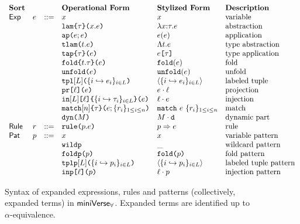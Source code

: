\begin{figure}[p] 
$\begin{array}{lllllll}
\textbf{Sort} & & & \textbf{Operational Form} & \textbf{Stylized Form} & \textbf{Description}\\
\mathsf{Exp} & e & ::= & x & x & \text{variable}\\
&&& \texttt{lam}\texttt{\{}\tau\texttt{\}(}x.e\texttt{)} & \lambda x{:}\tau.e & \text{abstraction}\\
&&& \texttt{ap}\texttt{(}e; e\texttt{)} & e(e) & \text{application}\\
&&& \texttt{tlam}\texttt{(}t.e\texttt{)} & \Lambda t.e & \text{type abstraction}\\
&&& \texttt{tap}\texttt{\{}\tau\texttt{\}(}e\texttt{)} & e\texttt{[}\tau\texttt{]} & \text{type application}\\
&&& \texttt{fold}\texttt{\{}t.\tau\texttt{\}(}e\texttt{)} & \texttt{fold}(e) & \text{fold}\\
&&& \texttt{unfold}\texttt{(}e\texttt{)} & \texttt{unfold}(e) & \text{unfold}\\
&&& \texttt{tpl}[L]\texttt{(}\{i \hookrightarrow e_{i}\}_{i \in L}\texttt{)} & \langle \{i \hookrightarrow e_{i}\}_{i \in L}\rangle & \text{labeled tuple}\\
&&& \texttt{pr}\texttt{[}\ell\texttt{](}e\texttt{)} & e \cdot \ell & \text{projection}\\
&&& \texttt{in}[L]\texttt{[}\ell\texttt{]\{}\{i \hookrightarrow \tau_{i}\}_{i \in L}\texttt{\}(}e\texttt{)} & \ell \cdot e & \text{injection}\\
&&& \texttt{match}[n]\texttt{\{}\tau\texttt{\}(}e; \{r_{i}\}_{1 \leq i \leq n}\texttt{)} & \texttt{match}~e~\{r_{i}\}_{1 \leq i \leq n} & \text{match}\\
&&& \texttt{dyn}\texttt{(}M\texttt{)} & M \cdot \texttt{d} & \text{dynamic part}\\
\mathsf{Rule} & r & ::= & \texttt{rule}\texttt{(}p.e\texttt{)} & p \Rightarrow e & \text{rule}\\
\mathsf{Pat} & p & ::= & x & x & \text{variable pattern}\\
&&& \texttt{wildp} & \_ & \text{wildcard pattern}\\
&&& \texttt{foldp}\texttt{(}p\texttt{)} & \texttt{fold}\texttt{(}p\texttt{)} & \text{fold pattern}\\
&&& \texttt{tplp}[L]\texttt{(}\{i \hookrightarrow p_{i}\}_{i \in L}\texttt{)} & \langle \{i \hookrightarrow p_{i}\}_{i \in L} \rangle & \text{labeled tuple pattern}\\
&&& \texttt{inp}\texttt{[}\ell\texttt{](}p\texttt{)} & \ell \cdot p & \text{injection pattern}
\end{array}$
\caption[Syntax of expanded expressions, rules and patterns in $\miniVerseParam$]{Syntax of expanded expressions, rules and patterns (collectively, expanded terms) in $\miniVerseParam$. Expanded terms are identified up to $\alpha$-equivalence.}
\label{fig:P-expanded-terms}
\end{figure}

